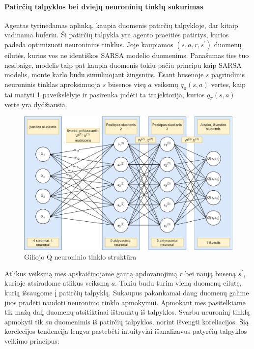 \documentclass[a4paper, 12pt]{article}
\begin{document}
\paragraph{Patirčių talpyklos bei dviejų neuroninių tinklų sukurimas}
\label{TalpyklosSkyrius}
Agentas tyrinėdamas aplinką, kaupia duomenis patirčių talpykloje, dar kitaip vadinama buferiu. Ši patirčių talpykla yra agento praeities patirtys, kurios padeda optimizuoti neuroninius tinklus. Joje kaupiamos $(s,a,r,s^\prime)$ duomenų eilutės, kurios vos ne identiškos SARSA modelio duomenims. Panašumas ties tuo nesibaige, modelis taip pat kaupia duomenis tokiu pačiu principu kaip SARSA modelis, monte karlo budu simuliuojant žingsnius. Esant būsenoje $s$ pagrindinis neuroninis tinklas aproksimuoja $s$ būsenos visų $a$ veiksmų $q_{\pi}(s, a)$ vertes, kaip tai matyti \ref{QNeuroniniaiTinklai} paveikslėlyje ir pasirenka judėti ta trajektorija, kurios $q_{\pi}(s, a)$ vertė yra dydžiausia. 

\begin{figure}[h]
\centering
\includegraphics[width=1\textwidth]{Q Neuronu diagrama}
\caption{Giliojo Q neuroninio tinklo struktūra}
\label{QNeuroniniaiTinklai}
\end{figure}


Atlikus veiksmą mes apskaičiuojame gautą apdovanojimą $r$ bei naują buseną $s^\prime$, kurioje atsiradome atlikus veiksmą $a$. Tokiu budu turim vieną duomenų eilutę, kurią išsaugome į patirčių talpyklą. Sukaupus pakankamai daug duomenų galime juos pradėti naudoti neuroninio tinklo apmokymui. Apmokant mes pasitelkiame tik mažą dalį duomenų atsitiktinai ištrauktų iš talpyklos. Svarbu neuroninį tinklą apmokyti tik su duomenimis iš patirčių talpyklos, norint išvengti koreliacijos. Šią korelecijos tendencija lengva pastebėti intuityviai išanalizavus patyrčių talpyklos veikimo principus:
\end{document}
